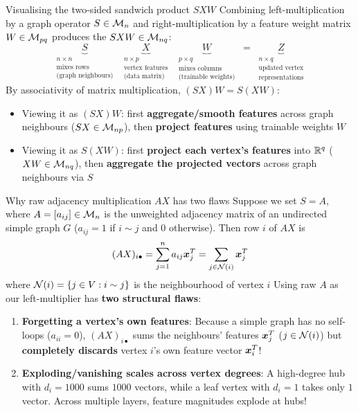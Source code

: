 \documentclass[aspectratio=169]{beamer}\usepackage[]{graphicx}\usepackage[]{xcolor}
\begin{document}
\begin{frame}{Visualising the two-sided sandwich product $S X W$}
Combining left-multiplication by a graph operator $S \in \mathcal{M}_n$ and right-multiplication by a feature weight matrix $W \in \mathcal{M}_{pq}$ produces the  $S X W \in \mathcal{M}_{nq}$:
\vfill
\[
\underbrace{S}_{\substack{n \times n \\ \text{mixes rows} \\ \text{(graph neighbours)}}}
\;\;
\underbrace{X}_{\substack{n \times p \\ \text{vertex features} \\ \text{(data matrix)}}}
\;\;
\underbrace{W}_{\substack{p \times q \\ \text{mixes columns} \\ \text{(trainable weights)}}}
\;=\;
\underbrace{Z}_{\substack{n \times q \\ \text{updated vertex} \\ \text{representations}}}
\]
\vfill
By associativity of matrix multiplication, $(SX)W = S(XW)$:
\begin{itemize}
\item Viewing it as $(SX)W$: first \textbf{aggregate/smooth features} across graph neighbours ($SX \in \mathcal{M}_{np}$), then \textbf{project features} using trainable weights $W$
\item Viewing it as $S(XW)$: first \textbf{project each vertex's features} into $\mathbb{R}^q$ ($XW \in \mathcal{M}_{nq}$), then \textbf{aggregate the projected vectors} across graph neighbours via $S$
\end{itemize}
\end{frame}



\begin{frame}{Why raw adjacency multiplication $AX$ has two flaws}
Suppose we set $S = A$, where $A = [a_{ij}] \in \mathcal{M}_n$ is the unweighted adjacency matrix of an undirected simple graph $G$ ($a_{ij} = 1$ if $i \sim j$ and $0$ otherwise). Then row $i$ of $AX$ is
\[
(AX)_{i\bullet} = \sum_{j=1}^n a_{ij} \bm{x}_j^T = \sum_{j \in \mathcal{N}(i)} \bm{x}_j^T
\]
where $\mathcal{N}(i) = \{ j \in V : i \sim j \}$ is the neighbourhood of vertex $i$
\vfill
Using raw $A$ as our left-multiplier has \textbf{two structural flaws}:
\begin{enumerate}
\item \textbf{Forgetting a vertex's own features}: Because a simple graph has no self-loops ($a_{ii} = 0$), $(AX)_{i\bullet}$ sums the neighbours' features $\bm{x}_j^T$ ($j \in \mathcal{N}(i)$) but \textbf{completely discards} vertex $i$'s own feature vector $\bm{x}_i^T$!
\vfill
\item \textbf{Exploding/vanishing scales across vertex degrees}: A high-degree hub with $d_i = 1000$ sums $1000$ vectors, while a leaf vertex with $d_i = 1$ takes only $1$ vector. Across multiple layers, feature magnitudes explode at hubs!
\end{enumerate}
\end{frame}
\end{document}
